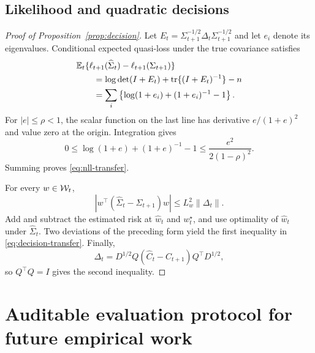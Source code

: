 \subsection{Likelihood and quadratic decisions}

\begin{proof}[Proof of Proposition~\ref{prop:decision}]
Let
$E_t=\Sigma_{t+1}^{-1/2}\Delta_t\Sigma_{t+1}^{-1/2}$ and let $e_i$ denote its eigenvalues.  Conditional expected quasi-loss under the true covariance satisfies
\begin{align}
 &\mathbb{E}_t\{\ell_{t+1}(\widehat\Sigma_t)-\ell_{t+1}(\Sigma_{t+1})\}\\
 &\qquad=\log\det(I+E_t)+\operatorname{tr}\{(I+E_t)^{-1}\}-n\\
 &\qquad=\sum_i\left\{\log(1+e_i)+(1+e_i)^{-1}-1\right\}.
\end{align}
For $|e|\le\rho<1$, the scalar function on the last line has derivative $e/(1+e)^2$ and value zero at the origin.  Integration gives
\begin{equation}
 0\le \log(1+e)+(1+e)^{-1}-1
 \le \frac{e^2}{2(1-\rho)^2}.
\end{equation}
Summing proves \eqref{eq:nll-transfer}.

For every $w\in\mathcal{W}_t$,
\begin{equation}
 |w^\top(\widehat\Sigma_t-\Sigma_{t+1})w|
 \le L_w^2\|\Delta_t\|.
\end{equation}
Add and subtract the estimated risk at $\widehat w_t$ and $w_t^\star$, and use optimality of $\widehat w_t$ under $\widehat\Sigma_t$.  Two deviations of the preceding form yield the first inequality in \eqref{eq:decision-transfer}.  Finally,
\begin{equation}
 \Delta_t=D^{1/2}Q(\widehat C_t-C_{t+1})Q^\top D^{1/2},
\end{equation}
so $Q^\top Q=I$ gives the second inequality.
\end{proof}

\section{Auditable evaluation protocol for future empirical work}
\label{app:evaluation}


